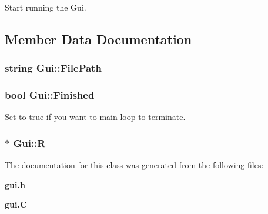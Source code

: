 Start running the Gui.



\subsection{Member Data Documentation}
\subsubsection{\setlength{\rightskip}{0pt plus 5cm}string Gui::File\-Path\hspace{0.3cm}{\tt  [protected]}}\label{classGui_n0}


\subsubsection{\setlength{\rightskip}{0pt plus 5cm}bool Gui::Finished}\label{classGui_m1}


Set to true if you want to main loop to terminate.

\subsubsection{ $\ast$ Gui::R}\label{classGui_m0}




The documentation for this class was generated from the following files:\begin{CompactItemize}
\item 
{\bf gui.h}\item 
{\bf gui.C}\end{CompactItemize}
